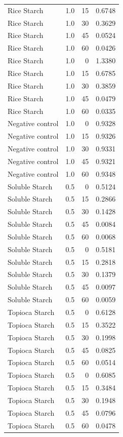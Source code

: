 \documentclass[
  12pt,
]{article}
\begin{document}
{\begin{longtable}[]{@{}lrrr@{}}
Rice Starch & 1.0 & 15 & 0.6748 \\
Rice Starch & 1.0 & 30 & 0.3629 \\
Rice Starch & 1.0 & 45 & 0.0524 \\
Rice Starch & 1.0 & 60 & 0.0426 \\
Rice Starch & 1.0 & 0 & 1.3380 \\
Rice Starch & 1.0 & 15 & 0.6785 \\
Rice Starch & 1.0 & 30 & 0.3859 \\
Rice Starch & 1.0 & 45 & 0.0479 \\
Rice Starch & 1.0 & 60 & 0.0335 \\
Negative control & 1.0 & 0 & 0.9328 \\
Negative control & 1.0 & 15 & 0.9326 \\
Negative control & 1.0 & 30 & 0.9331 \\
Negative control & 1.0 & 45 & 0.9321 \\
Negative control & 1.0 & 60 & 0.9348 \\
Soluble Starch & 0.5 & 0 & 0.5124 \\
Soluble Starch & 0.5 & 15 & 0.2866 \\
Soluble Starch & 0.5 & 30 & 0.1428 \\
Soluble Starch & 0.5 & 45 & 0.0084 \\
Soluble Starch & 0.5 & 60 & 0.0068 \\
Soluble Starch & 0.5 & 0 & 0.5181 \\
Soluble Starch & 0.5 & 15 & 0.2818 \\
Soluble Starch & 0.5 & 30 & 0.1379 \\
Soluble Starch & 0.5 & 45 & 0.0097 \\
Soluble Starch & 0.5 & 60 & 0.0059 \\
Topioca Starch & 0.5 & 0 & 0.6128 \\
Topioca Starch & 0.5 & 15 & 0.3522 \\
Topioca Starch & 0.5 & 30 & 0.1998 \\
Topioca Starch & 0.5 & 45 & 0.0825 \\
Topioca Starch & 0.5 & 60 & 0.0514 \\
Topioca Starch & 0.5 & 0 & 0.6085 \\
Topioca Starch & 0.5 & 15 & 0.3484 \\
Topioca Starch & 0.5 & 30 & 0.1948 \\
Topioca Starch & 0.5 & 45 & 0.0796 \\
Topioca Starch & 0.5 & 60 & 0.0478 \\

\end{longtable}}
\end{document}
